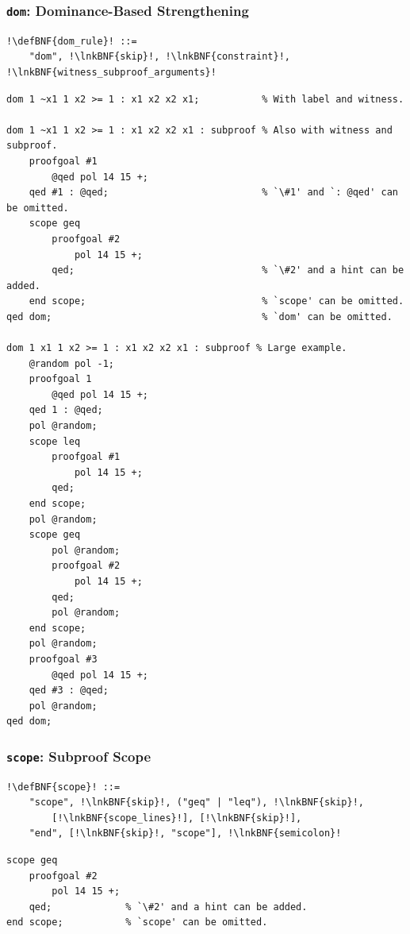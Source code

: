 \documentclass[a4paper]{article}
\newcommand{\defBNF}[1]{\hypertarget{def:#1}{<\detokenize{#1}>}}
\newcommand{\lnkBNF}[1]{\hyperlink{def:#1}{<\detokenize{#1}>}}
\begin{document}
\subsubsection{\texttt{dom}: Dominance-Based Strengthening}\label{sec:rules-dom}
\begin{lstlisting}
!\defBNF{dom_rule}! ::=
	"dom", !\lnkBNF{skip}!, !\lnkBNF{constraint}!, !\lnkBNF{witness_subproof_arguments}!
\end{lstlisting}
\begin{lstlisting}[language=veripb]
dom 1 ~x1 1 x2 >= 1 : x1 x2 x2 x1;           % With label and witness.

dom 1 ~x1 1 x2 >= 1 : x1 x2 x2 x1 : subproof % Also with witness and subproof.
	proofgoal #1
		@qed pol 14 15 +;
	qed #1 : @qed;                           % `\#1' and `: @qed' can be omitted.
	scope geq
		proofgoal #2
			pol 14 15 +;
		qed;                                 % `\#2' and a hint can be added.
	end scope;                               % `scope' can be omitted.
qed dom;                                     % `dom' can be omitted.

dom 1 x1 1 x2 >= 1 : x1 x2 x2 x1 : subproof % Large example.
	@random pol -1;
	proofgoal 1
		@qed pol 14 15 +;
	qed 1 : @qed;
	pol @random;
	scope leq
		proofgoal #1
			pol 14 15 +;
		qed;
	end scope;
	pol @random;
	scope geq
		pol @random;
		proofgoal #2
			pol 14 15 +;
		qed;
		pol @random;
	end scope;
	pol @random;
	proofgoal #3
		@qed pol 14 15 +;
	qed #3 : @qed;
	pol @random;
qed dom;

\end{lstlisting}


\subsubsection{\texttt{scope}: Subproof Scope}\label{sec:rules-scope}
\begin{lstlisting}
!\defBNF{scope}! ::=
	"scope", !\lnkBNF{skip}!, ("geq" | "leq"), !\lnkBNF{skip}!,
		[!\lnkBNF{scope_lines}!], [!\lnkBNF{skip}!],
	"end", [!\lnkBNF{skip}!, "scope"], !\lnkBNF{semicolon}!
\end{lstlisting}
\begin{lstlisting}[language=veripb]
scope geq
	proofgoal #2
		pol 14 15 +;
	qed;             % `\#2' and a hint can be added.
end scope;           % `scope' can be omitted.
\end{lstlisting}
\end{document}
